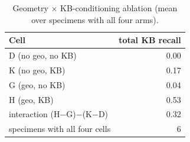 \begin{table}[H]\centering\scriptsize
\caption{Geometry $\times$ KB-conditioning ablation (mean over specimens with all four arms).}
{
\begin{tabular}{lr}\toprule
Cell & total KB recall \\ \midrule
D (no geo, no KB) & 0.00 \\
K (no geo, KB) & 0.17 \\
G (geo, no KB) & 0.04 \\
H (geo, KB) & 0.53 \\
interaction (H$-$G)$-$(K$-$D) & 0.32 \\
specimens with all four cells & 6 \\
\bottomrule\end{tabular}}\end{table}
